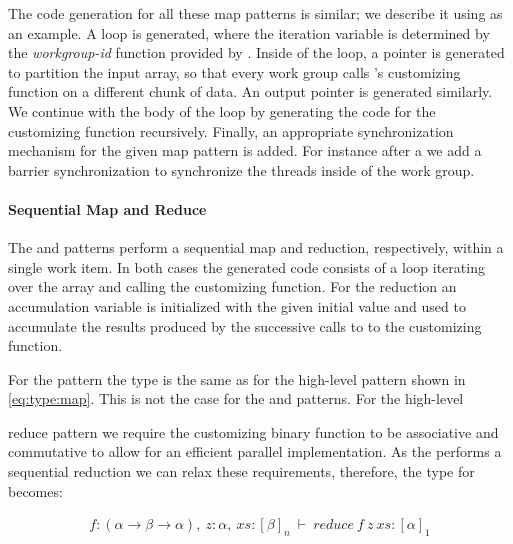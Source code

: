 The code generation for all these map patterns is similar; we describe it using  as an example.
A loop is generated, where the iteration variable is determined by the \emph{workgroup-id} function provided by \OpenCL.
Inside of the loop, a pointer is generated to partition the input array, so that every work group calls 's customizing function on a different chunk of data.
An output pointer is generated similarly.
We continue with the body of the loop by generating the code for the customizing function recursively.
Finally, an appropriate synchronization mechanism for the given map pattern is added.
For instance after a  we add a barrier synchronization to synchronize the threads inside of the work group.




\paragraph{Sequential Map and Reduce}
The  and  patterns perform a sequential map and reduction, respectively, within a single work item.
In both cases the generated code consists of a loop iterating over the array and calling the customizing function.
For the reduction an accumulation variable is initialized with the given initial value and used to accumulate the results produced by the successive calls to to the customizing function.

For the  pattern the type is the same as for the high-level  pattern shown in \autoref{eq:type:map}.
This is not the case for the  and  patterns.
For the high-level \par{reduce} pattern we require the customizing binary function to be associative and commutative to allow for an efficient parallel implementation.
As the  performs a sequential reduction we can relax these requirements, therefore, the type for  becomes:

\begin{align}
  f : (\alpha \rightarrow \beta \rightarrow \alpha),\ z : \alpha,\ xs : [\beta]_n\ \vdash\ reduce\ f\ z\ xs : [\alpha]_1
  \label{eq:type:reduce-seq}
\end{align}

